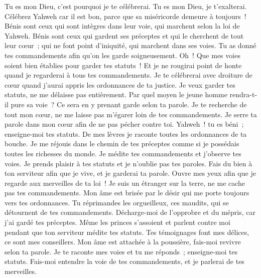 \begin{multicols}{2}
Tu es mon Dieu, c'est pourquoi je te célébrerai. Tu es mon Dieu, je t'exalterai.
Célébrez Yahweh car il est bon, parce que sa miséricorde demeure à toujours~!
\VerseOne{} Bénis sont ceux qui sont intègres dans leur voie, qui marchent selon la loi de Yahweh.
Bénis sont ceux qui gardent ses préceptes et qui le cherchent de tout leur cœur~;
qui ne font point d'iniquité, qui marchent dans ses voies.
Tu as donné tes commandements afin qu'on les garde soigneusement.
Oh~! Que mes voies soient bien établies pour garder tes statuts~!
Et je ne rougirai point de honte quand je regarderai à tous tes commandements.
Je te célébrerai avec droiture de cœur quand j'aurai appris les ordonnances de ta justice.
Je veux garder tes statuts, ne me délaisse pas entièrement.
 Par quel moyen le jeune homme rendra-t-il pure sa voie~? Ce sera en y prenant garde selon ta parole.
Je te recherche de tout mon cœur, ne me laisse pas m'égarer loin de tes commandements.
Je serre ta parole dans mon cœur afin de ne pas pécher contre toi.
Yahweh~! tu es béni~; enseigne-moi tes statuts.
De mes lèvres je raconte toutes les ordonnances de ta bouche.
Je me réjouis dans le chemin de tes préceptes comme si je possédais toutes les richesses du monde.
Je médite tes commandements et j'observe tes voies.
Je prends plaisir à tes statuts et je n'oublie pas tes paroles.
 Fais du bien à ton serviteur afin que je vive, et je garderai ta parole.
Ouvre mes yeux afin que je regarde aux merveilles de ta loi~!
Je suis un étranger sur la terre, ne me cache pas tes commandements.
Mon âme est brisée par le désir qui me porte toujours vers tes ordonnances.
Tu réprimandes les orgueilleux, ces maudits, qui se détournent de tes commandements.
Décharge-moi de l'opprobre et du mépris, car j'ai gardé tes préceptes.
Même les princes s'assoient et parlent contre moi pendant que ton serviteur médite tes statuts.
Tes témoignages font mes délices, ce sont mes conseillers.
 Mon âme est attachée à la poussière, fais-moi revivre selon ta parole.
Je te raconte mes voies et tu me réponds~; enseigne-moi tes statuts.
Fais-moi entendre la voie de tes commandements, et je parlerai de tes merveilles.

\end{multicols}
